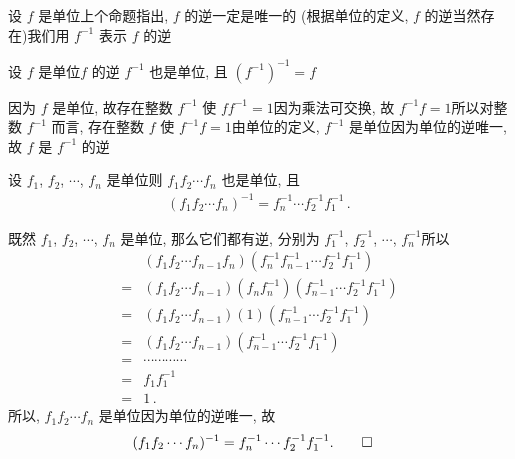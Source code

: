 \begin{definition}
    设 $f$ 是单位\period 上个命题指出, $f$ 的逆一定是唯一的 (根据单位的定义, $f$ 的逆当然存在)\period 我们用 $f^{-1}$ 表示 $f$ 的逆\period
\end{definition}

\begin{proposition}
    设 $f$ 是单位\period $f$ 的逆 $f^{-1}$ 也是单位, 且 $(f^{-1})^{-1} = f$\period
\end{proposition}

\begin{pf}
    因为 $f$ 是单位, 故存在整数 $f^{-1}$ 使 $ff^{-1} = 1$\period 因为乘法可交换, 故 $f^{-1} f = 1$\period 所以对整数 $f^{-1}$ 而言, 存在整数 $f$ 使 $f^{-1} f = 1$\period 由单位的定义, $f^{-1}$ 是单位\period 因为单位的逆唯一, 故 $f$ 是 $f^{-1}$ 的逆\period
\end{pf}

\begin{proposition}
    设 $f_1$, $f_2$, $\cdots$, $f_n$ 是单位\period 则 $f_1 f_2 \cdots f_n$ 也是单位, 且
    \begin{align*}
        (f_1 f_2 \cdots f_n)^{-1} = f_n^{-1} \cdots f_2^{-1} f_1^{-1} \period
    \end{align*}
\end{proposition}

\begin{pf}
    既然 $f_1$, $f_2$, $\cdots$, $f_n$ 是单位, 那么它们都有逆, 分别为 $f_1^{-1}$, $f_2^{-1}$, $\cdots$, $f_n^{-1}$\period 所以
    \begin{align*}
             & (f_1 f_2 \cdots f_{n-1} f_n) (f_n^{-1} f_{n-1}^{-1} \cdots f_2^{-1} f_1^{-1})   \\
        = {} & (f_1 f_2 \cdots f_{n-1}) (f_n f_n^{-1}) (f_{n-1}^{-1} \cdots f_2^{-1} f_1^{-1}) \\
        = {} & (f_1 f_2 \cdots f_{n-1}) (1) (f_{n-1}^{-1} \cdots f_2^{-1} f_1^{-1})            \\
        = {} & (f_1 f_2 \cdots f_{n-1}) (f_{n-1}^{-1} \cdots f_2^{-1} f_1^{-1})                \\
        = {} & \cdots \cdots \cdots \cdots                                                     \\
        = {} & f_1 f_1^{-1}                                                                    \\
        = {} & 1 \period
    \end{align*}
    所以, $f_1 f_2 \cdots f_n$ 是单位\period 因为单位的逆唯一, 故
    \begin{align*}
         & (f_1 f_2 \cdots f_n)^{-1} = f_n^{-1} \cdots f_2^{-1} f_1^{-1} . \qedhere
    \end{align*}
\end{pf}

